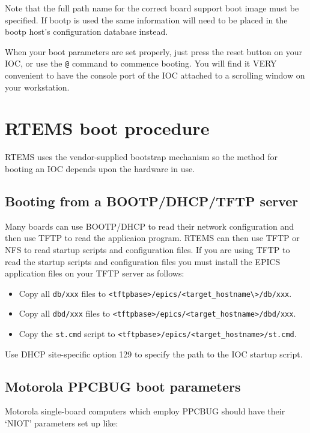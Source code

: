 Note that the full path name for the correct board support boot image must be specified.
If bootp is used the same information will need to be placed in the bootp host's configuration database instead.

When your boot parameters are set properly, just press the reset button on your IOC, or use the \verb|@| command to commence booting.
You will find it VERY convenient to have the console port of the IOC attached to a scrolling window on your workstation.

\section{RTEMS boot procedure}

RTEMS uses the vendor-supplied bootstrap mechanism so the method for booting an IOC depends upon the hardware in use.

\subsection{Booting from a BOOTP/DHCP/TFTP server}

Many boards can use BOOTP/DHCP to read their network configuration and then use TFTP to read the applicaion program.
RTEMS can then use TFTP or NFS to read startup scripts and configuration files.
If you are using TFTP to read the startup scripts and configuration files you must install the EPICS application files on your TFTP server as follows:

\begin{itemize}
\item Copy all \verb|db/xxx| files to \verb|<tftpbase>/epics/<target_hostname\>/db/xxx|.

\item Copy all \verb|dbd/xxx| files to \verb|<tftpbase>/epics/<target_hostname>/dbd/xxx|.

\item Copy the \verb|st.cmd| script  to \verb|<tftpbase>/epics/<target_hostname>/st.cmd|.
\end{itemize}

Use DHCP site-specific option 129 to specify the path to the IOC startup script.

\subsection{Motorola PPCBUG boot parameters}

Motorola single-board computers which employ PPCBUG should have their `NIOT' parameters set up like:

